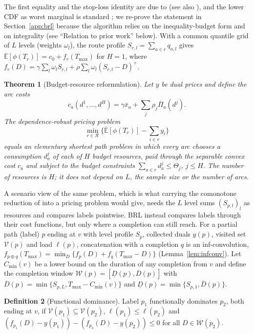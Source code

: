 \documentclass[preprint,11pt]{elsarticle}
\newtheorem{theorem}{Theorem}
\theoremstyle{definition}
\newtheorem{definition}[theorem]{Definition}
\theoremstyle{remark}
\newcommand{\cR}{\mathcal{R}}
\newcommand{\Eu}{\overline{\mathbb{E}}}
\newcommand{\Pib}{\overline{\Pi}}
\newcommand{\xb}{\bar x}
\newcommand{\pos}[1]{\left(#1\right)^{+}}
\newcommand{\Dl}{\underline{D}}
\newcommand{\Dh}{\overline{D}}
\begin{document}
The first equality and the stop-loss identity are due to \citet{Meilijson1979} (see also \citealp{Kaas2000,Dhaene2002}), and the lower CDF as worst marginal is standard \citep{Williamson1990}; we re-prove the statement in Section~\ref{app:brl} because the algorithm relies on the inequality-budget form and on integrality (see ``Relation to prior work'' below). With a common quantile grid of $L$ levels (weights $\omega_l$), the route profile $S_{r,l}=\sum_{a\in r}q_{a,l}$ gives $\Eu[\phi(T_r)]=c_0+f_r(T_{\max})$ for $H=1$, where $f_r(D)=\gamma\sum_l\omega_lS_{r,l}+\rho\sum_l\omega_l\pos{S_{r,l}-D}$.

\begin{theorem}[Budget-resource reformulation]\label{thm:resource}
Let $y$ be dual prices and define the arc costs \[c_a(d^1,\dots,d^H)=\gamma\xb_a+\sum_j\rho_j\Pib_a(d^j).\] The dependence-robust pricing problem \[\min_{r\in\cR}\Big\{\Eu[\phi(T_r)]-\sum_{i\in r}y_i\Big\}\] equals an elementary shortest path problem in which every arc chooses a consumption $d^j_a$ of each of $H$ budget resources, paid through the separable convex cost $c_a$ and subject to the budget constraints $\sum_{a\in r}d^j_a\le\Theta_j$, $j\le H$. The number of resources is $H$; it does not depend on $L$, the sample size or the number of arcs.
\end{theorem}

A scenario view of the same problem, which is what carrying the comonotone reduction of \citet{GhosalHoWiesemann2024} into a pricing problem would give, needs the $L$ level sums $(S_{p,l})_l$ as resources and compares labels pointwise. BRL instead compares labels through their cost functions, but only where a completion can still reach. For a partial path (label) $p$ ending at $v$ with level profile $S_p$, collected duals $y(p)$, visited set $\mathcal V(p)$ and load $\ell(p)$, concatenation with a completion $q$ is an inf-convolution, $f_{p\oplus q}(T_{\max})=\min_D\{f_p(D)+f_q(T_{\max}-D)\}$ (Lemma~\ref{lem:infconv}). Let $C_{\min}(v)$ be a lower bound on the duration of any completion from $v$ and define the completion window $\mathcal W(p)=[\Dl(p),\Dh(p)]$ with $\Dh(p)=\min\{S_{p,L},T_{\max}-C_{\min}(v)\}$ and $\Dl(p)=\min\{S_{p,1},\Dh(p)\}$.

\begin{definition}[Functional dominance]\label{def:fdom}
Label $p_1$ functionally dominates $p_2$, both ending at $v$, if $\mathcal V(p_1)\subseteq\mathcal V(p_2)$, $\ell(p_1)\le\ell(p_2)$ and $(f_{p_1}(D)-y(p_1))-(f_{p_2}(D)-y(p_2))\le0$ for all $D\in\mathcal W(p_2)$.
\end{definition}
\end{document}
